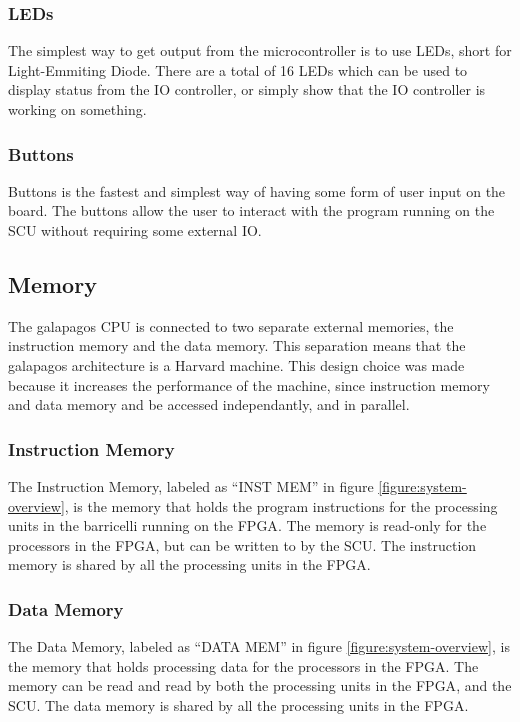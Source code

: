 \subsubsection{LEDs}

The simplest way to get output from the microcontroller is to use LEDs, short for Light-Emmiting Diode.
There are a total of 16 LEDs which can be used to display status from the IO controller, or simply show that the IO controller is working on something.

\subsubsection{Buttons}

Buttons is the fastest and simplest way of having some form of user input on the board.
The buttons allow the user to interact with the program running on the SCU without requiring some external IO.

\subsection{Memory}

The \Gls{galapagos} CPU is connected to two separate external memories, the instruction memory and the data memory.
This separation means that the \Gls{galapagos} architecture is a Harvard machine.
This design choice was made because it increases the performance of the machine, since instruction memory and data memory and be accessed independantly, and in parallel. 

\subsubsection{Instruction Memory}

The Instruction Memory, labeled as ``INST MEM'' in figure \vref{figure:system-overview}, is the memory that holds the program instructions for the processing units in the \Gls{barricelli} running on the \gls{FPGA}.
The memory is read-only for the processors in the \gls{FPGA}, but can be written to by the \gls{SCU}.
The instruction memory is shared by all the processing units in the \gls{FPGA}.

\subsubsection{Data Memory}

The Data Memory, labeled as ``DATA MEM'' in figure \vref{figure:system-overview}, is the memory that holds processing data for the processors in the \gls{FPGA}.
The memory can be read and read by both the processing units in the \gls{FPGA}, and the \gls{SCU}.
The data memory is shared by all the processing units in the \gls{FPGA}.
